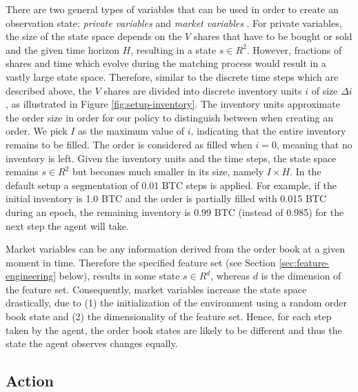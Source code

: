 There are two general types of variables that can be used in order to create an observation state: \textit{private variables} and \textit{market variables} \cite{nevmyvaka2006reinforcement}.
For private variables, the size of the state space depends on the $V$ shares that have to be bought or sold and the given time horizon $H$, resulting in a state $s \in R^2$.
However, fractions of shares and time which evolve during the matching process would result in a vastly large state space.
Therefore, similar to the discrete time steps which are described above, the $V$ shares are divided into discrete inventory units $i$ of size $\Delta{i}$, as illustrated in Figure \ref{fig:setup-inventory}.
The inventory units approximate the order size in order for our policy to distinguish between when creating an order.
We pick $I$ as the maximum value of $i$, indicating that the entire inventory remains to be filled.
The order is considered as filled when $i=0$, meaning that no inventory is left.
Given the inventory units and the time steps, the state space remains $s \in R^2$ but becomes much smaller in its size, namely $I \times H$.
In the default setup a segmentation of 0.01 BTC steps is applied.
For example, if the initial inventory is 1.0 BTC and the order is partially filled with 0.015 BTC during an epoch, the remaining inventory is 0.99 BTC (instead of 0.985) for the next step the agent will take.

Market variables can be any information derived from the order book at a given moment in time.
Therefore the specified feature set (see Section \ref{sec:feature-engineering} below), results in some state $s \in R^d$, whereas $d$ is the dimension of the feature set.
Consequently, market variables increase the state space drastically, due to (1) the initialization of the environment using a random order book state and (2) the dimensionality of the feature set.
Hence, for each step taken by the agent, the order book states are likely to be different and thus the state the agent observes changes equally. 

\subsection{Action}

